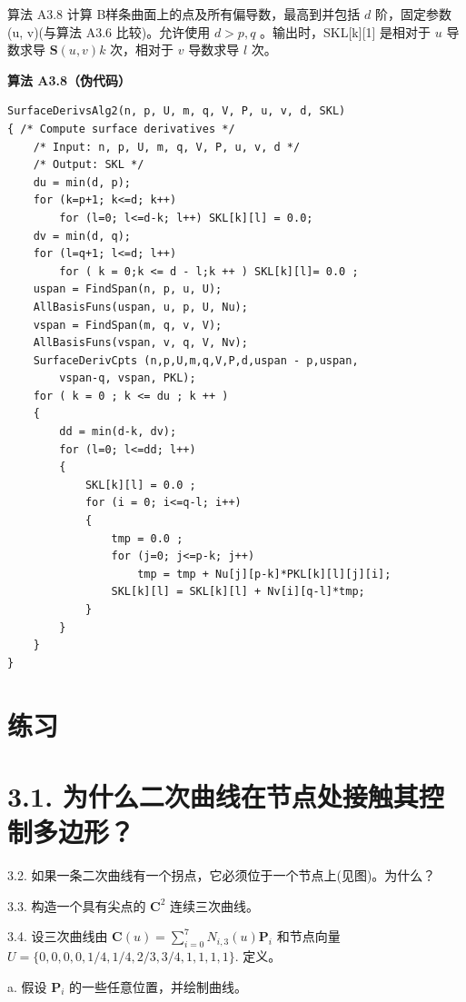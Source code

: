 \documentclass[../main.tex]{subfiles}
\begin{document}
算法 A3.8 计算 B样条曲面上的点及所有偏导数，最高到并包括 \(d\) 阶，固定参数 (u, v)(与算法 A3.6 比较)。允许使用 \(d > p,q\) 。输出时，SKL[k][1] 是相对于 \(u\) 导数求导 \(\mathbf{S}\left( {u,v}\right) k\) 次，相对于 \(v\) 导数求导 \(l\) 次。

\par\medskip\noindent\textbf{算法 A3.8（伪代码）}\par
\begin{verbatim}
SurfaceDerivsAlg2(n, p, U, m, q, V, P, u, v, d, SKL)
{ /* Compute surface derivatives */
    /* Input: n, p, U, m, q, V, P, u, v, d */
    /* Output: SKL */
    du = min(d, p);
    for (k=p+1; k<=d; k++)
        for (l=0; l<=d-k; l++) SKL[k][l] = 0.0;
    dv = min(d, q);
    for (l=q+1; l<=d; l++)
        for ( k = 0;k <= d - l;k ++ ) SKL[k][l]= 0.0 ;
    uspan = FindSpan(n, p, u, U);
    AllBasisFuns(uspan, u, p, U, Nu);
    vspan = FindSpan(m, q, v, V);
    AllBasisFuns(vspan, v, q, V, Nv);
    SurfaceDerivCpts (n,p,U,m,q,V,P,d,uspan - p,uspan,
        vspan-q, vspan, PKL);
    for ( k = 0 ; k <= du ; k ++ )
    {
        dd = min(d-k, dv);
        for (l=0; l<=dd; l++)
        {
            SKL[k][l] = 0.0 ;
            for (i = 0; i<=q-l; i++)
            {
                tmp = 0.0 ;
                for (j=0; j<=p-k; j++)
                    tmp = tmp + Nu[j][p-k]*PKL[k][l][j][i];
                SKL[k][l] = SKL[k][l] + Nv[i][q-l]*tmp;
            }
        }
    }
}
\end{verbatim}

\section*{练习}

\section*{3.1. 为什么二次曲线在节点处接触其控制多边形？}

3.2. 如果一条二次曲线有一个拐点，它必须位于一个节点上(见图)。为什么？

3.3. 构造一个具有尖点的 \({\mathbf{C}}^{2}\) 连续三次曲线。

3.4. 设三次曲线由 \(\mathbf{C}\left( u\right)  = \mathop{\sum }\limits_{{i = 0}}^{7}{N}_{i,3}\left( u\right) {\mathbf{P}}_{i}\) 和节点向量 \(U = \{ 0,0,0,0,1/4,1/4,2/3,3/4,1,1,1,1\} .\) 定义。

a. 假设 \({\mathbf{P}}_{i}\) 的一些任意位置，并绘制曲线。
\end{document}
